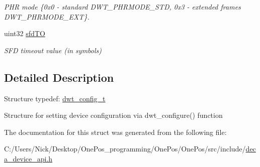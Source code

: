 \begin{DoxyCompactItemize}
\begin{DoxyCompactList}\small\item\em P\-H\-R mode \{0x0 -\/ standard D\-W\-T\-\_\-\-P\-H\-R\-M\-O\-D\-E\-\_\-\-S\-T\-D, 0x3 -\/ extended frames D\-W\-T\-\_\-\-P\-H\-R\-M\-O\-D\-E\-\_\-\-E\-X\-T\}. \end{DoxyCompactList}\item 
\hypertarget{structdwt__config__t_a190ba091b936e4eb471fb764a277b65a}{uint32 \hyperlink{structdwt__config__t_a190ba091b936e4eb471fb764a277b65a}{sfd\-T\-O}}\label{structdwt__config__t_a190ba091b936e4eb471fb764a277b65a}

\begin{DoxyCompactList}\small\item\em S\-F\-D timeout value (in symbols) \end{DoxyCompactList}\end{DoxyCompactItemize}


\subsection{Detailed Description}


 Structure typedef\-: \hyperlink{structdwt__config__t}{dwt\-\_\-config\-\_\-t}

Structure for setting device configuration via dwt\-\_\-configure() function 

The documentation for this struct was generated from the following file\-:\begin{DoxyCompactItemize}
\item 
C\-:/\-Users/\-Nick/\-Desktop/\-One\-Pos\-\_\-programming/\-One\-Pos/\-One\-Pos/src/include/\hyperlink{deca__device__api_8h}{deca\-\_\-device\-\_\-api.\-h}\end{DoxyCompactItemize}
